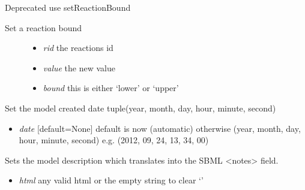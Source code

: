 \documentclass[a4paper,11pt,english]{sphinxmanual}
\begin{document}
\begin{fulllineitems}

\begin{fulllineitems}
\label{modules_doc:cbmpy.CBModel.Model.setBoundValueByName}
Deprecated use setReactionBound
\begin{description}
\item[{Set a reaction bound}] \leavevmode\begin{itemize}
\item {} 
\emph{rid} the reactions id

\item {} 
\emph{value} the new value

\item {} 
\emph{bound} this is either `lower' or `upper'

\end{itemize}

\end{description}

\end{fulllineitems}


\begin{fulllineitems}
\label{modules_doc:cbmpy.CBModel.Model.setCreatedDate}
Set the model created date tuple(year, month, day, hour, minute, second)
\begin{itemize}
\item {} 
\emph{date} {[}default=None{]} default is now (automatic) otherwise (year, month, day, hour, minute, second) e.g. (2012, 09, 24, 13, 34, 00)

\end{itemize}

\end{fulllineitems}


\begin{fulllineitems}
\label{modules_doc:cbmpy.CBModel.Model.setDescription}
Sets the model description which translates into the SBML \textless{}notes\textgreater{} field.
\begin{itemize}
\item {} 
\emph{html} any valid html or the empty string to clear `'


\end{itemize}
\end{fulllineitems}
\end{fulllineitems}
\end{document}
